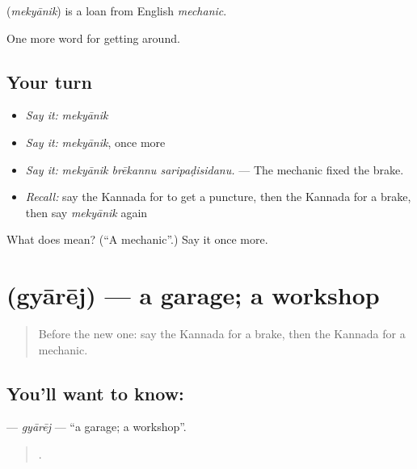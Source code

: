 \begin{cousinweb}
\textbf{} (\emph{mekyānik}) is a loan from English \emph{mechanic}.
\end{cousinweb}

\begin{grammarlens}[title={What you've built}]
One more word for getting around.
\end{grammarlens}

\subsection*{Your turn}
\begin{itemize}
\raggedright
  \item \emph{Say it:} \emph{mekyānik}
  \item \emph{Say it:} \emph{mekyānik}, once more
  \item \emph{Say it:} \emph{mekyānik brēkannu saripaḍisidanu.} — The mechanic fixed the brake.
  \item \emph{Recall:} say the Kannada for to get a puncture, then the Kannada for a brake, then say \emph{mekyānik} again
\end{itemize}

\begin{tcolorbox}[breakable,colback=teal!4,colframe=teal!35!black,title={Before you move on}]
What does  mean? (\textquotedblleft{}A mechanic\textquotedblright{}.) Say it once more.
\end{tcolorbox}
\section[\texorpdfstring{\kn{ಗ್ಯಾರೇಜ್} (gyārēj)}{ಗ್ಯಾರೇಜ್ (gyārēj)}]{ (gyārēj) — a garage; a workshop}

\label{lesson:KA-C450-gyarej}



\begin{quote}
Before the new one: say the Kannada for a brake, then the Kannada for a mechanic.
\end{quote}

\subsection*{You'll want to know: }
\textbf{} — \emph{gyārēj} — \textquotedblleft{}a garage; a workshop\textquotedblright{}.

\begin{quote}
     .
\end{quote}

